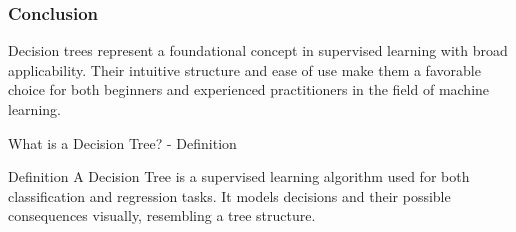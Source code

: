 \documentclass[aspectratio=169]{beamer}
\begin{document}
\begin{frame}[fragile]
    \frametitle{Conclusion}
    Decision trees represent a foundational concept in supervised learning with broad applicability. Their intuitive structure and ease of use make them a favorable choice for both beginners and experienced practitioners in the field of machine learning.
\end{frame}

\begin{frame}[fragile]{What is a Decision Tree? - Definition}
    \begin{block}{Definition}
        A Decision Tree is a supervised learning algorithm used for both classification and regression tasks. It models decisions and their possible consequences visually, resembling a tree structure.
    \end{block}
\end{frame}
\end{document}
